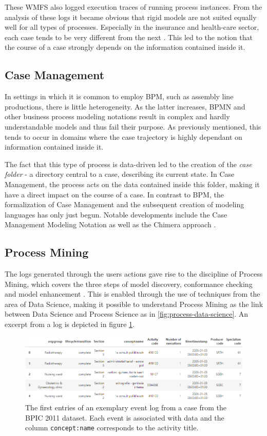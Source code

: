 These WMFS also logged execution traces of running process instances. From the analysis of these logs it became obvious that rigid models are not suited equally well for all types of processes. Especially in the insurance and health-care sector, each case tends to be very different from the next \cite{hewelt2016}. This led to the notion that the course of a case strongly depends on the information contained inside it.

\subsection{Case Management}
In settings in which it is common to employ BPM, such as assembly line productions, there is little heterogeneity. As the latter increases, BPMN and other business process modeling notations result in complex and hardly understandable models and thus fail their purpose. As previously mentioned, this tends to occur in domains where the case trajectory is highly dependant on information contained inside it.

The fact that this type of process is data-driven led to the creation of the \textit{case folder} - a directory central to a case, describing its current state. In Case Management, the process acts on the data contained inside this folder, making it have a direct impact on the course of a case. In contrast to BPM, the formalization of Case Management and the subsequent creation of modeling languages has only just begun. Notable developments include the Case Management Modeling Notation \cite{web:cmmn} as well as the Chimera approach \cite{hewelt2016}.

\subsection{Process Mining}
The logs generated through the users actions gave rise to the discipline of Process Mining, which covers the three steps of model discovery, conformance checking and model enhancement \cite{Aalst2016}. This is enabled through the use of techniques from the area of Data Science, making it possible to understand Process Mining as the link between Data Science and Process Science as in \autoref{fig:process-data-science}. An excerpt from a log is depicted in figure \ref{fig:process-log}.

\begin{figure}
    \centering
    \includegraphics[width=\textwidth]{gfx/process-log}
    \caption{The first entries of an exemplary event log from a case from the BPIC 2011 dataset\cite{BPIC2011}. Each event is associated with data and the column \texttt{concept:name} corresponds to the activity title.}
    \label{fig:process-log}
\end{figure}

